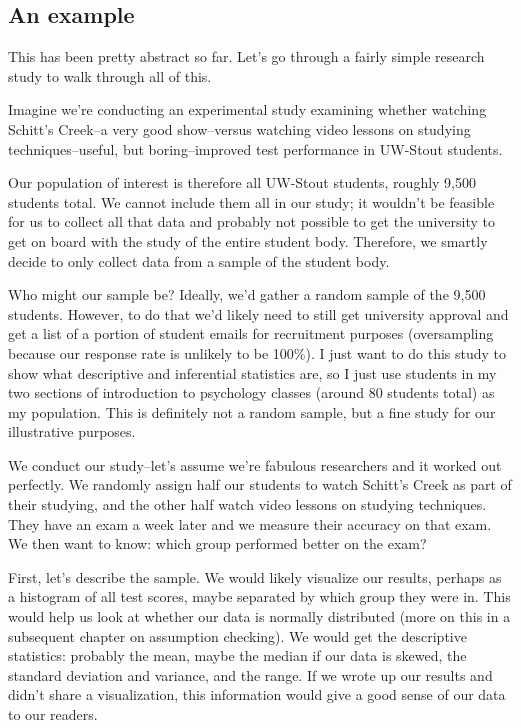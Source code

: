 \documentclass[
]{book}
\begin{document}
\hypertarget{an-example}{%
\subsection{An example}\label{an-example}}

This has been pretty abstract so far. Let's go through a fairly simple research study to walk through all of this.

Imagine we're conducting an experimental study examining whether watching Schitt's Creek--a very good show--versus watching video lessons on studying techniques--useful, but boring--improved test performance in UW-Stout students.

Our population of interest is therefore all UW-Stout students, roughly 9,500 students total. We cannot include them all in our study; it wouldn't be feasible for us to collect all that data and probably not possible to get the university to get on board with the study of the entire student body. Therefore, we smartly decide to only collect data from a sample of the student body.

Who might our sample be? Ideally, we'd gather a random sample of the 9,500 students. However, to do that we'd likely need to still get university approval and get a list of a portion of student emails for recruitment purposes (oversampling because our response rate is unlikely to be 100\%). I just want to do this study to show what descriptive and inferential statistics are, so I just use students in my two sections of introduction to psychology classes (around 80 students total) as my population. This is definitely not a random sample, but a fine study for our illustrative purposes.

We conduct our study--let's assume we're fabulous researchers and it worked out perfectly. We randomly assign half our students to watch Schitt's Creek as part of their studying, and the other half watch video lessons on studying techniques. They have an exam a week later and we measure their accuracy on that exam. We then want to know: which group performed better on the exam?

First, let's describe the sample. We would likely visualize our results, perhaps as a histogram of all test scores, maybe separated by which group they were in. This would help us look at whether our data is normally distributed (more on this in a subsequent chapter on assumption checking). We would get the descriptive statistics: probably the mean, maybe the median if our data is skewed, the standard deviation and variance, and the range. If we wrote up our results and didn't share a visualization, this information would give a good sense of our data to our readers.
\end{document}
